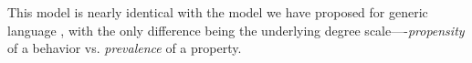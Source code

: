 \documentclass[10pt,letterpaper]{article}
\newcommand{\ndg}[1]{\textcolor{Green}{[ndg: #1]}}
\begin{document}
This model is nearly identical with the model we have proposed for generic language \cite{TesslerUnderReview}, with the only difference being the underlying degree scale----\emph{propensity} of a behavior vs. \emph{prevalence} of a property. 

%
%



%
% 
\end{document}
